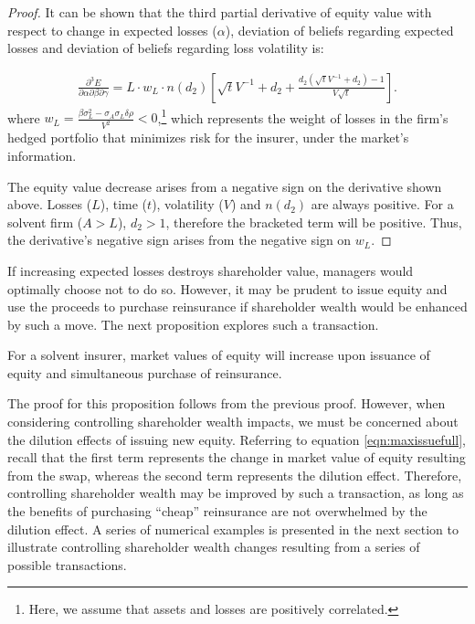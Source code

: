 \begin{proof}
It can be shown that the third partial derivative of equity value with respect to change in expected losses ($\alpha$), deviation of beliefs regarding expected losses and deviation of beliefs regarding loss volatility is:

\[\begin{array}{l}
\displaystyle\frac{{{\partial ^3}E}}{{\partial \alpha \partial \beta \partial \gamma }} = L \cdot {w_L} \cdot n\left( {{d_2}} \right)\left[ {\sqrt t {V^{ - 1}} + {d_2} +\displaystyle\frac{ {d_2}{\left( {\sqrt t {V^{ - 1}} + {d_2}} \right)-1}}{{V\sqrt t }}} \right].
\end{array}\]
where 
$w_L=\displaystyle \frac{\beta \sigma_L^2-\sigma_A\sigma_L\delta\rho}{V^2}<0$,\footnote{Here, we assume that assets and losses are positively correlated.} which represents the weight of losses in the firm's hedged portfolio that minimizes risk for the insurer, under the market's information.

The equity value decrease arises from a negative sign on the derivative shown above. Losses ($L$), time ($t$), volatility ($V$) and $n(d_2)$ are always positive. For a solvent firm ($A>L$), $d_2>1$, therefore the bracketed term will be positive. Thus, the derivative's negative sign arises from the negative sign on $w_L$.
\end{proof}

If increasing expected losses destroys shareholder value, managers would optimally choose not to do so. However, it may be prudent to issue equity and use the proceeds to purchase reinsurance if shareholder wealth would be enhanced by such a move. The next proposition explores such a transaction.

\begin{proposition}
For a solvent insurer, market values of equity will increase upon issuance of equity and simultaneous purchase of reinsurance.
\end{proposition}

The proof for this proposition follows from the previous proof. However, when considering controlling shareholder wealth impacts, we must be concerned about the dilution effects of issuing new equity. Referring to equation \ref{eqn:maxissuefull}, recall that the first term represents the change in market value of equity resulting from the swap, whereas the second term represents the dilution effect. Therefore, controlling shareholder wealth may be improved by such a transaction, as long as the benefits of purchasing ``cheap'' reinsurance are not overwhelmed by the dilution effect. A series of numerical examples is presented in the next section to illustrate controlling shareholder wealth changes resulting from a series of possible transactions.

